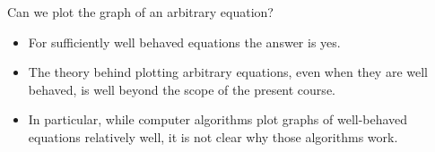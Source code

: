 \begin{frame}
\begin{question}
Can we plot the graph of an arbitrary equation?
\end{question}
\begin{itemize}
\item<2-> For sufficiently well behaved equations the answer is yes.
\item<4-> The theory behind plotting arbitrary equations, even when they are well behaved, is well beyond the scope of the present course. 
\item<5-> In particular, while computer algorithms plot graphs of well-behaved equations relatively well, it is not clear why those algorithms work.
\end{itemize}
\end{frame}